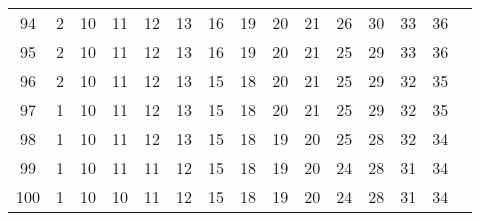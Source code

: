 \begin{scriptsize}
\begin{longtable}{c |c |c |c |c |c |c |c |c |c |c |c |c |c |c}
		94 & 2 & 10 & 11 & 12 & 13 & 16 & 19 & 20 & 21 & 26 & 30 & 33 & 36\\
		95 & 2 & 10 & 11 & 12 & 13 & 16 & 19 & 20 & 21 & 25 & 29 & 33 & 36\\
		96 & 2 & 10 & 11 & 12 & 13 & 15 & 18 & 20 & 21 & 25 & 29 & 32 & 35\\
		97 & 1 & 10 & 11 & 12 & 13 & 15 & 18 & 20 & 21 & 25 & 29 & 32 & 35\\
		98 & 1 & 10 & 11 & 12 & 13 & 15 & 18 & 19 & 20 & 25 & 28 & 32 & 34\\
		99 & 1 & 10 & 11 & 11 & 12 & 15 & 18 & 19 & 20 & 24 & 28 & 31 & 34\\
		100 & 1 & 10 & 10 & 11 & 12 & 15 & 18 & 19 & 20 & 24 & 28 & 31 & 34\\
\end{longtable}\end{scriptsize}

\newpage

